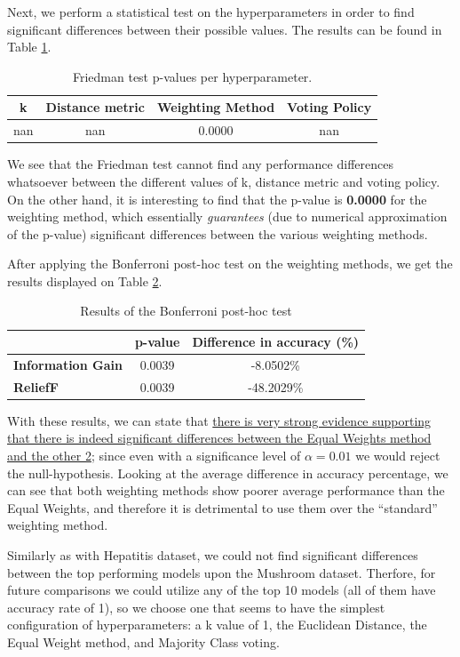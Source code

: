 Next, we perform a statistical test on the hyperparameters in order to find significant differences between their possible values. The results can be found in Table \ref{tab:knn:mush:hyperparam}.
\begin{table}[h]
    \centering
    \small
    \begin{tabular}{|c|c|c|c|}
        \hline
        \textbf{k} & \textbf{Distance metric} & \textbf{Weighting Method} & \textbf{Voting Policy} \\ \hline
        nan & nan & 0.0000 & nan \\ \hline
    \end{tabular}
    \caption{Friedman test p-values per hyperparameter.}
    \label{tab:knn:mush:hyperparam}
\end{table}

We see that the Friedman test cannot find any performance differences whatsoever between the different values of k, distance metric and voting policy. On the other hand, it is interesting to find that the p-value is \textbf{0.0000} for the weighting method, which essentially \textit{guarantees} (due to numerical approximation of the p-value) significant differences between the various weighting methods.

After applying the Bonferroni post-hoc test on the weighting methods, we get the results displayed on Table \ref{tab:knn:mush:posthoc}.
\begin{table}[h!]
    \centering
    \small
    \begin{tabular}{|l|c|c|}
    \hline
                             & \textbf{p-value} & \textbf{Difference in accuracy (\%)} \\ \hline
    \textbf{Information Gain} & 0.0039           & -8.0502\%          \\ \hline
    \textbf{ReliefF}           & 0.0039           & -48.2029\%          \\ \hline
    \end{tabular}
    \caption{Results of the Bonferroni post-hoc test}
    \label{tab:knn:mush:posthoc}
\end{table}

With these results, we can state that \uline{there is very strong evidence supporting that there is indeed significant differences between the Equal Weights method and the other 2}; since even with a significance level of $ \alpha = 0.01 $ we would reject the null-hypothesis. Looking at the average difference in accuracy percentage, we can see that both weighting methods show poorer average performance than the Equal Weights, and therefore it is detrimental to use them over the ``standard'' weighting method.

Similarly as with Hepatitis dataset, we could not find significant differences between the top performing models upon the Mushroom dataset. Therfore, for future comparisons we could utilize any of the top 10 models (all of them have accuracy rate of 1), so we choose one that seems to have the simplest configuration of hyperparameters: a k value of 1, the Euclidean Distance, the Equal Weight method, and Majority Class voting.
